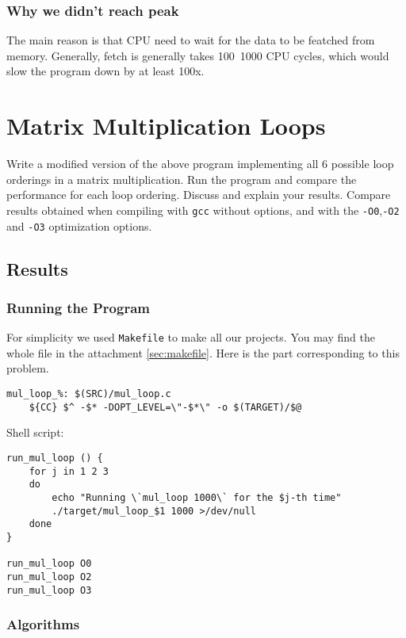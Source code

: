 \documentclass[12pt]{article}
\begin{document}
\subsubsection{Why we didn't reach peak}

The main reason is that CPU need to wait for the data to be featched from memory.
Generally, fetch is generally takes 100~1000 CPU cycles, which would slow the program down by at least 100x.

\section{Matrix Multiplication Loops}
Write a modified version of the above program implementing all 6 possible loop orderings in a matrix multiplication.
Run the program and compare the performance for each loop ordering. Discuss and explain your results.  Compare results obtained when compiling with \lstinline$gcc$ without options, and with the \lstinline$-O0$,\lstinline$-O2$ and \lstinline$-O3$ optimization options.

\subsection{Results}

\subsubsection{Running the Program}
For simplicity we used \texttt{Makefile} to make all our projects.
You may find the whole file in the attachment \autoref{sec:makefile}.
Here is the part corresponding to this problem.
\begin{lstlisting}
mul_loop_%: $(SRC)/mul_loop.c
	${CC} $^ -$* -DOPT_LEVEL=\"-$*\" -o $(TARGET)/$@
\end{lstlisting}

Shell script:
\begin{lstlisting}
run_mul_loop () { 
    for j in 1 2 3
    do
        echo "Running \`mul_loop 1000\` for the $j-th time"
        ./target/mul_loop_$1 1000 >/dev/null
    done
}

run_mul_loop O0
run_mul_loop O2
run_mul_loop O3
\end{lstlisting}

\subsubsection{Algorithms}
\end{document}
